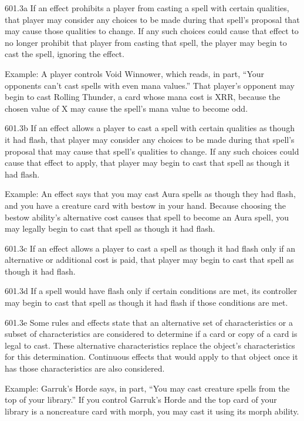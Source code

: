 601.3a If an effect prohibits a player from casting a spell with certain qualities, that player may consider any choices to be made during that spell’s proposal that may cause those qualities to change. If any such choices could cause that effect to no longer prohibit that player from casting that spell, the player may begin to cast the spell, ignoring the effect.

Example: A player controls Void Winnower, which reads, in part, “Your opponents can’t cast spells with even mana values.” That player’s opponent may begin to cast Rolling Thunder, a card whose mana cost is {X}{R}{R}, because the chosen value of X may cause the spell’s mana value to become odd.

601.3b If an effect allows a player to cast a spell with certain qualities as though it had flash, that player may consider any choices to be made during that spell’s proposal that may cause that spell’s qualities to change. If any such choices could cause that effect to apply, that player may begin to cast that spell as though it had flash.

Example: An effect says that you may cast Aura spells as though they had flash, and you have a creature card with bestow in your hand. Because choosing the bestow ability’s alternative cost causes that spell to become an Aura spell, you may legally begin to cast that spell as though it had flash.

601.3c If an effect allows a player to cast a spell as though it had flash only if an alternative or additional cost is paid, that player may begin to cast that spell as though it had flash.

601.3d If a spell would have flash only if certain conditions are met, its controller may begin to cast that spell as though it had flash if those conditions are met.

601.3e Some rules and effects state that an alternative set of characteristics or a subset of characteristics are considered to determine if a card or copy of a card is legal to cast. These alternative characteristics replace the object’s characteristics for this determination. Continuous effects that would apply to that object once it has those characteristics are also considered.

Example: Garruk’s Horde says, in part, “You may cast creature spells from the top of your library.” If you control Garruk’s Horde and the top card of your library is a noncreature card with morph, you may cast it using its morph ability.

